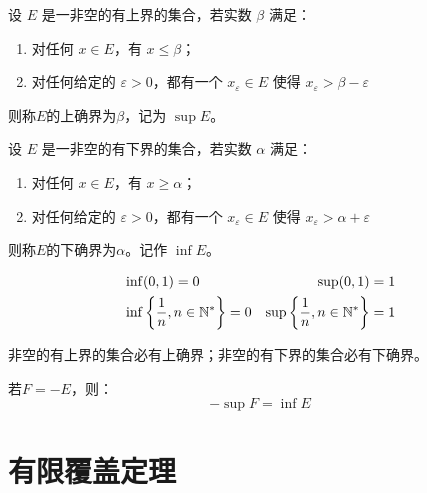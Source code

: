 \begin{definition}[上确界]
	设 $E$ 是一非空的有上界的集合，若实数 $\beta$ 满足：
	\begin{enumerate}
		\item 对任何 $x\in E$，有 $x\le \beta$；
		\item 对任何给定的 $\varepsilon > 0$，都有一个 $x_\varepsilon\in E$ 使得 $x_\varepsilon > \beta - \varepsilon$
	\end{enumerate}
	则称$E$的上确界为$\beta$，记为 $\sup E$。
\end{definition}

\begin{definition}[下确界]
	设 $E$ 是一非空的有下界的集合，若实数 $\alpha$ 满足：
	\begin{enumerate}
		\item 对任何 $x\in E$，有 $x\ge \alpha$；
		\item 对任何给定的 $\varepsilon > 0$，都有一个 $x_\varepsilon\in E$ 使得 $x_\varepsilon > \alpha + \varepsilon$
	\end{enumerate}
	则称$E$的下确界为$\alpha$。记作 $\inf E$。
\end{definition}

\begin{example}
	$$
	\begin{aligned}
	& \inf(0,1) = 0 & \sup (0, 1) = 1\\
	& \inf\left\{\frac 1 n, n\in \mathbb{N}^*\right\} = 0 & \sup\left\{\frac 1 n, n\in \mathbb{N}^*\right\}=1
	\end{aligned}
	$$
\end{example}



\begin{theorem}[确界存在定理]\label{thm-supremum-axiom}
	非空的有上界的集合必有上确界；非空的有下界的集合必有下确界。
\end{theorem}




\begin{inference}[确界的性质]
	若$F=-E$，则：
	$$
	-\sup F = \inf E
	$$
\end{inference}

\section{有限覆盖定理}

